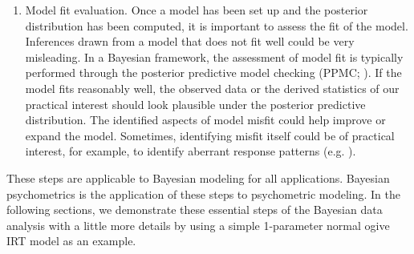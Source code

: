 \documentclass[floatsintext, man]{apa7}
\begin{document}
\begin{enumerate}
  \item Model fit evaluation. Once a model has been set up and the posterior
  distribution has been computed, it is important to assess the fit of the
  model. Inferences drawn from a model that does not fit well could be very
  misleading. In a Bayesian framework, the assessment of model fit is typically
  performed through the posterior predictive model checking (PPMC; 
  \cite{gelman_bayesian_2013,rubin_bayesianly_1984}). If the model fits
  reasonably well, the observed data or
  the derived statistics of our practical interest should look plausible under
  the posterior predictive distribution. The identified aspects of model misfit
  could help improve or expand the model. Sometimes, identifying misfit itself
  could be of practical interest, for example, to identify aberrant response
  patterns (e.g. \cite{sinharay_assessment_2015}).
\end{enumerate}

These steps are applicable to Bayesian modeling for all applications. Bayesian
psychometrics is the application of these steps to psychometric modeling.
In the following sections, we demonstrate these essential steps of the Bayesian
data analysis with a little more details by using a simple 1-parameter normal
ogive IRT model as an example.
\end{document}
